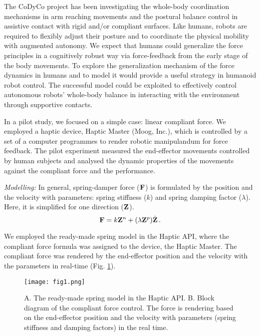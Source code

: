 The CoDyCo project has been investigating the whole-body coordination mechanisms in arm reaching movements and the postural balance control in assistive contact with rigid and/or compliant surfaces. Like humans, robots are required to flexibly adjust their posture and to coordinate the physical mobility with augmented autonomy. We expect that humans could generalize the force principles in a cognitively robust way via force-feedback from the early stage of the body movements. To explore the generalization mechanism of the force dynamics in humans and to model it would provide a useful strategy in humanoid robot control. The successful model could be exploited to effectively control autonomous robots' whole-body balance in interacting with the environment through supportive contacts.

In a pilot study, we focused on a simple case: linear compliant force. We employed a haptic device, Haptic Master (Moog, Inc.), which is controlled by a set of a computer programmes to render robotic manipulandum for force feedback. The pilot experiment measured the end-effector movements controlled by human subjects and analysed the dynamic properties of the movements against the compliant force and the performance.




\textit{Modelling:} In general, spring-damper force ($\mathbf{F}$) is formulated by the position and the velocity with parameters: spring stiffness ($k$) and spring damping factor ($\lambda$). Here, it is simplified for one direction ($\mathbf{Z}$).
%
\begin{equation}
\mathbf{F} = k \mathbf{Z}^n + (\lambda \mathbf{Z}^p) \dot{\mathbf{Z}} \, .
\end{equation}
%

We employed the ready-made spring model in the Haptic API, where the compliant force formula was assigned to the device, the Haptic Master. The compliant force was rendered by the end-effector position and the velocity with the parameters in real-time (Fig. \ref{modelling}). 
%
\begin{figure}
	\centering
	\texttt{[image: fig1.png]}
	\caption{A. The ready-made spring model in the Haptic API. B. Block diagram of the compliant force control. The force is rendering based on the end-effector position and the velocity with parameters (spring stiffness and damping factors) in the real time.}
	\label{modelling}
\end{figure}


